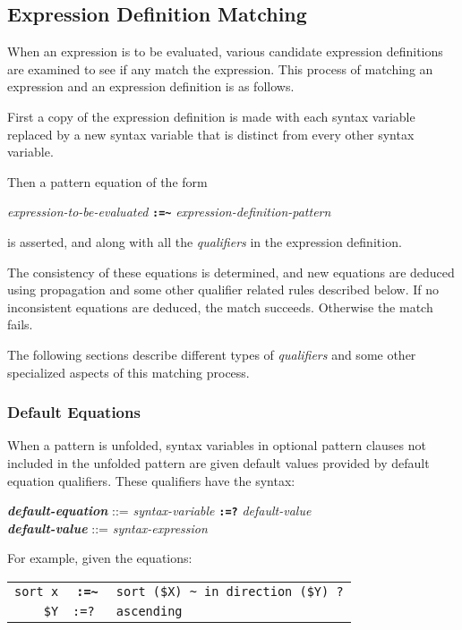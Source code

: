 \documentclass[12pt]{article}
\newcommand{\TT}[1]{{\tt \bfseries #1}}
\newcommand{\ttkey}[1]{{\tt \bfseries #1}}
\newcommand{\emkey}[1]{{\em \bfseries #1}}
\newcommand{\TILDE}{\textasciitilde}
\newenvironment{indpar}[1][0.3in]%
	{\begin{list}{}%
		     {\setlength{\itemsep}{0in}%
		      \setlength{\topsep}{0in}%
		      \setlength{\parsep}{1ex}%
		      \setlength{\labelwidth}{#1}%
		      \setlength{\leftmargin}{#1}%
		      \addtolength{\leftmargin}{\labelsep}}%
	 \item}%
	{\end{list}}
\begin{document}
\subsection{Expression Definition Matching}

When an expression is to be evaluated,
various candidate expression definitions are examined
to see if any match the expression.  This process of matching
an expression and an expression definition is as follows.

First a copy of the expression definition is made with
each syntax variable replaced by a new syntax variable that
is distinct from every other syntax variable.

Then a pattern equation of the form
\begin{center}
{\em expression-to-be-evaluated} \TT{:=\TILDE}
{\em expression-definition-pattern}
\end{center}
is asserted, and along with all the {\em qualifiers} in the
expression definition.

The consistency of these equations is determined, and new equations
are deduced using propagation and some other qualifier related
rules described below.
If no inconsistent equations are deduced, the match succeeds.
Otherwise the match fails.

The following sections describe different types of {\em qualifiers}
and some other specialized aspects of this matching process. 

\subsubsection{Default Equations}
\label{DEFAULT-EQUATIONS}

When a pattern is unfolded, syntax variables in optional pattern clauses
not included in the unfolded pattern are given default values
provided by default equation qualifiers.  These qualifiers have the
syntax:

\begin{indpar}
\emkey{default-equation} ::= {\em syntax-variable} \ttkey{:=?}
			     {\em default-value}
\\[1ex]
\emkey{default-value} ::= {\em syntax-expression}
\end{indpar}

For example, given the equations:

\begin{center}
\begin{tabular}{rcl}
\verb/sort x/ & \TT{:=\TILDE} & \verb/sort ($X) ~ in direction ($Y) ?/ \\
\verb/$Y/ & \tt :=? & \verb|ascending|
\end{tabular}
\end{center}
\end{document}
